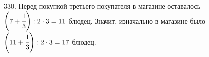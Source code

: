 330. Перед покупкой третьего покупателя в магазине оставалось $\left(7+\cfrac{1}{3}\right):2\cdot3=11$ блюдец. Значит, изначально в магазине было $\left(11+\cfrac{1}{3}\right):2\cdot3=17$ блюдец.\\
